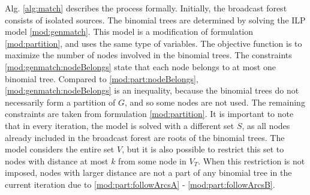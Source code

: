 Alg. \ref{alg:match} describes the process formally.
Initially, the broadcast forest consists of isolated sources.
The binomial trees are determined by solving the ILP model \eqref{mod:genmatch}. 
This model is a modification of formulation \eqref{mod:partition}, and uses the same type of variables.
The objective function is to maximize the number of nodes involved in the binomial trees.
The constraints \eqref{mod:genmatch:nodeBelongs} state that each node belongs to at most one binomial tree.
Compared to \eqref{mod:part:nodeBelongs}, \eqref{mod:genmatch:nodeBelongs} is an inequality, because the binomial trees do not necessarily form a partition of $G$, and so some nodes are not used.
The remaining constraints are taken from formulation \eqref{mod:partition}. 
It is important to note that in every iteration, the model is solved with a different set $S$, as all nodes already included in the broadcast forest are roots of the binomial trees.
The model considers the entire set $V$, but it is also possible to restrict this set to nodes with distance at most $k$ from some node in $V_T$.
When this restriction is not imposed, nodes with larger distance are not a part of any binomial tree in the current iteration due to \eqref{mod:part:followArcsA} - \eqref{mod:part:followArcsB}.

